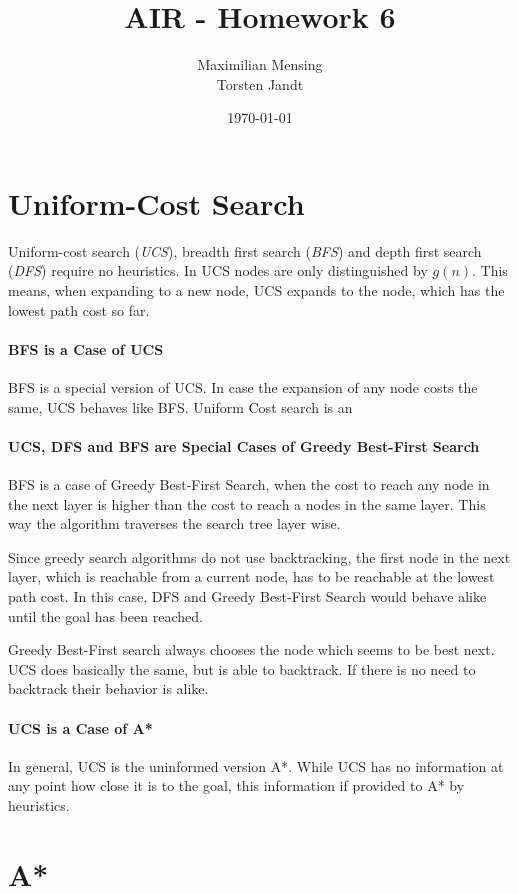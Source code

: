 \documentclass[a4paper,headsepline,12pt]{scrartcl}
\title{AIR - Homework 6}
\date{\today}
\author{Maximilian Mensing\\Torsten Jandt}
\begin{document}
\maketitle{}
\section{Uniform-Cost Search}
Uniform-cost search (\emph{UCS}), breadth first search (\emph{BFS}) and depth first search (\emph{DFS}) require no heuristics. In UCS nodes are only distinguished by \( g(n)\). This means, when expanding to a new node, UCS expands to the node, which has the lowest path cost so far.
\paragraph{BFS is a Case of UCS}
BFS is a special version of UCS. In case the expansion of any node costs the same, UCS behaves like BFS.
Uniform Cost search is an 

\paragraph{UCS, DFS and BFS are Special Cases of Greedy Best-First Search}
BFS is a case of Greedy Best-First Search, when the cost to reach any node in the next layer is higher than the cost to reach a nodes in the same layer. This way the algorithm traverses the search tree layer wise. 

Since greedy search algorithms do not use backtracking, the first node in the next layer, which is reachable from a current node, has to be reachable at the lowest path cost. In this case, DFS and  Greedy Best-First Search would behave alike until the goal has been reached. 

Greedy  Best-First search always chooses the node which seems to be best next. UCS does basically the same, but is able to backtrack. If there is no need to backtrack their behavior is alike.
\paragraph{UCS is a Case of A*}
In general, UCS is the uninformed version A*. While UCS has no information at any point how close it is to the goal, this information if provided to A* by heuristics.

\newpage
\section{A*}
\end{document}

